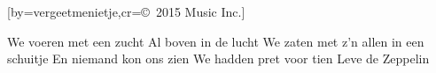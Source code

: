  

[by=vergeetmenietje,cr={\copyright~2015 Music Inc.}]




\beginverse
We voeren met een zucht
Al boven in de lucht
We zaten met z'n allen in een schuitje
En niemand kon ons zien
We hadden pret voor tien
Leve de Zeppelin
\endverse




\endsong
